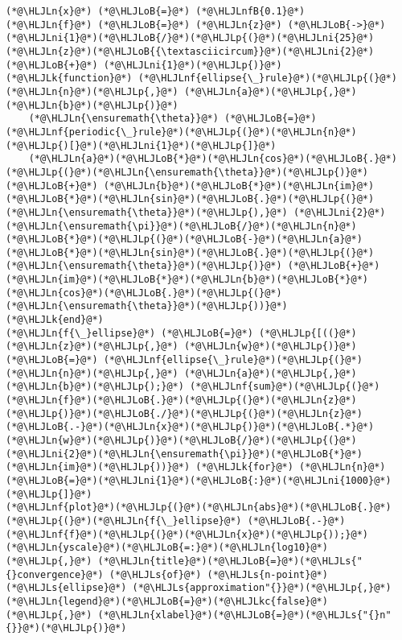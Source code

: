 \documentclass[12pt,landscape]{article}
\newcommand{\HLJLk}[1]{\textcolor[RGB]{148,91,176}{\textbf{#1}}}
\newcommand{\HLJLkc}[1]{\textcolor[RGB]{59,151,46}{\textit{#1}}}
\newcommand{\HLJLn}[1]{#1}
\newcommand{\HLJLnf}[1]{\textcolor[RGB]{66,102,213}{#1}}
\newcommand{\HLJLs}[1]{\textcolor[RGB]{201,61,57}{#1}}
\newcommand{\HLJLnfB}[1]{\textcolor[RGB]{59,151,46}{#1}}
\newcommand{\HLJLni}[1]{\textcolor[RGB]{59,151,46}{#1}}
\newcommand{\HLJLoB}[1]{\textcolor[RGB]{102,102,102}{\textbf{#1}}}
\newcommand{\HLJLp}[1]{#1}
\begin{document}
{\begin{lstlisting}
(*@\HLJLn{x}@*) (*@\HLJLoB{=}@*) (*@\HLJLnfB{0.1}@*)
(*@\HLJLn{f}@*) (*@\HLJLoB{=}@*) (*@\HLJLn{z}@*) (*@\HLJLoB{->}@*) (*@\HLJLni{1}@*)(*@\HLJLoB{/}@*)(*@\HLJLp{(}@*)(*@\HLJLni{25}@*)(*@\HLJLn{z}@*)(*@\HLJLoB{{\textasciicircum}}@*)(*@\HLJLni{2}@*) (*@\HLJLoB{+}@*) (*@\HLJLni{1}@*)(*@\HLJLp{)}@*)
(*@\HLJLk{function}@*) (*@\HLJLnf{ellipse{\_}rule}@*)(*@\HLJLp{(}@*)(*@\HLJLn{n}@*)(*@\HLJLp{,}@*) (*@\HLJLn{a}@*)(*@\HLJLp{,}@*) (*@\HLJLn{b}@*)(*@\HLJLp{)}@*)
    (*@\HLJLn{\ensuremath{\theta}}@*) (*@\HLJLoB{=}@*) (*@\HLJLnf{periodic{\_}rule}@*)(*@\HLJLp{(}@*)(*@\HLJLn{n}@*)(*@\HLJLp{)[}@*)(*@\HLJLni{1}@*)(*@\HLJLp{]}@*)
    (*@\HLJLn{a}@*)(*@\HLJLoB{*}@*)(*@\HLJLn{cos}@*)(*@\HLJLoB{.}@*)(*@\HLJLp{(}@*)(*@\HLJLn{\ensuremath{\theta}}@*)(*@\HLJLp{)}@*) (*@\HLJLoB{+}@*) (*@\HLJLn{b}@*)(*@\HLJLoB{*}@*)(*@\HLJLn{im}@*)(*@\HLJLoB{*}@*)(*@\HLJLn{sin}@*)(*@\HLJLoB{.}@*)(*@\HLJLp{(}@*)(*@\HLJLn{\ensuremath{\theta}}@*)(*@\HLJLp{),}@*) (*@\HLJLni{2}@*)(*@\HLJLn{\ensuremath{\pi}}@*)(*@\HLJLoB{/}@*)(*@\HLJLn{n}@*)(*@\HLJLoB{*}@*)(*@\HLJLp{(}@*)(*@\HLJLoB{-}@*)(*@\HLJLn{a}@*)(*@\HLJLoB{*}@*)(*@\HLJLn{sin}@*)(*@\HLJLoB{.}@*)(*@\HLJLp{(}@*)(*@\HLJLn{\ensuremath{\theta}}@*)(*@\HLJLp{)}@*) (*@\HLJLoB{+}@*) (*@\HLJLn{im}@*)(*@\HLJLoB{*}@*)(*@\HLJLn{b}@*)(*@\HLJLoB{*}@*)(*@\HLJLn{cos}@*)(*@\HLJLoB{.}@*)(*@\HLJLp{(}@*)(*@\HLJLn{\ensuremath{\theta}}@*)(*@\HLJLp{))}@*)
(*@\HLJLk{end}@*)
(*@\HLJLn{f{\_}ellipse}@*) (*@\HLJLoB{=}@*) (*@\HLJLp{[((}@*)(*@\HLJLn{z}@*)(*@\HLJLp{,}@*) (*@\HLJLn{w}@*)(*@\HLJLp{)}@*) (*@\HLJLoB{=}@*) (*@\HLJLnf{ellipse{\_}rule}@*)(*@\HLJLp{(}@*)(*@\HLJLn{n}@*)(*@\HLJLp{,}@*) (*@\HLJLn{a}@*)(*@\HLJLp{,}@*) (*@\HLJLn{b}@*)(*@\HLJLp{);}@*) (*@\HLJLnf{sum}@*)(*@\HLJLp{(}@*)(*@\HLJLn{f}@*)(*@\HLJLoB{.}@*)(*@\HLJLp{(}@*)(*@\HLJLn{z}@*)(*@\HLJLp{)}@*)(*@\HLJLoB{./}@*)(*@\HLJLp{(}@*)(*@\HLJLn{z}@*)(*@\HLJLoB{.-}@*)(*@\HLJLn{x}@*)(*@\HLJLp{)}@*)(*@\HLJLoB{.*}@*)(*@\HLJLn{w}@*)(*@\HLJLp{)}@*)(*@\HLJLoB{/}@*)(*@\HLJLp{(}@*)(*@\HLJLni{2}@*)(*@\HLJLn{\ensuremath{\pi}}@*)(*@\HLJLoB{*}@*)(*@\HLJLn{im}@*)(*@\HLJLp{))}@*) (*@\HLJLk{for}@*) (*@\HLJLn{n}@*)(*@\HLJLoB{=}@*)(*@\HLJLni{1}@*)(*@\HLJLoB{:}@*)(*@\HLJLni{1000}@*)(*@\HLJLp{]}@*)
(*@\HLJLnf{plot}@*)(*@\HLJLp{(}@*)(*@\HLJLn{abs}@*)(*@\HLJLoB{.}@*)(*@\HLJLp{(}@*)(*@\HLJLn{f{\_}ellipse}@*) (*@\HLJLoB{.-}@*) (*@\HLJLnf{f}@*)(*@\HLJLp{(}@*)(*@\HLJLn{x}@*)(*@\HLJLp{));}@*) (*@\HLJLn{yscale}@*)(*@\HLJLoB{=:}@*)(*@\HLJLn{log10}@*)(*@\HLJLp{,}@*) (*@\HLJLn{title}@*)(*@\HLJLoB{=}@*)(*@\HLJLs{"{}convergence}@*) (*@\HLJLs{of}@*) (*@\HLJLs{n-point}@*) (*@\HLJLs{ellipse}@*) (*@\HLJLs{approximation"{}}@*)(*@\HLJLp{,}@*) (*@\HLJLn{legend}@*)(*@\HLJLoB{=}@*)(*@\HLJLkc{false}@*)(*@\HLJLp{,}@*) (*@\HLJLn{xlabel}@*)(*@\HLJLoB{=}@*)(*@\HLJLs{"{}n"{}}@*)(*@\HLJLp{)}@*)
\end{lstlisting}

}
\end{document}
